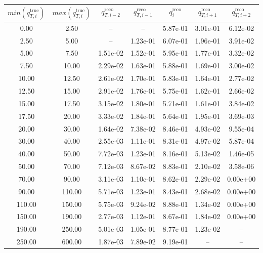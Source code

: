 \begin{tabular}{|cc||ccccc|} \hline 
$min(q^\mathrm{true}_{T,i})$ & $max(q^\mathrm{true}_{T,i})$ & $q^\mathrm{reco}_{T,i-2}$ & $q^\mathrm{reco}_{T,i-1}$ & $q^\mathrm{reco}_i$ & $q^\mathrm{reco}_{T,i+1}$ & $q^\mathrm{reco}_{T,i+2}$ \\ \hline 
 0.00 &  2.50 &  --  &  --  & 5.87e-01 & 3.01e-01 & 6.12e-02\\
 2.50 &  5.00 &  --  & 1.23e-01 & 6.07e-01 & 1.96e-01 & 3.91e-02\\
 5.00 &  7.50 & 1.51e-02 & 1.52e-01 & 5.95e-01 & 1.77e-01 & 3.32e-02\\
 7.50 & 10.00 & 2.29e-02 & 1.63e-01 & 5.88e-01 & 1.69e-01 & 3.00e-02\\
10.00 & 12.50 & 2.61e-02 & 1.70e-01 & 5.83e-01 & 1.64e-01 & 2.77e-02\\
12.50 & 15.00 & 2.91e-02 & 1.76e-01 & 5.75e-01 & 1.62e-01 & 2.66e-02\\
15.00 & 17.50 & 3.15e-02 & 1.80e-01 & 5.71e-01 & 1.61e-01 & 3.84e-02\\
17.50 & 20.00 & 3.33e-02 & 1.84e-01 & 5.64e-01 & 1.95e-01 & 3.69e-03\\
20.00 & 30.00 & 1.64e-02 & 7.38e-02 & 8.46e-01 & 4.93e-02 & 9.55e-04\\
30.00 & 40.00 & 2.55e-03 & 1.11e-01 & 8.31e-01 & 4.97e-02 & 5.87e-04\\
40.00 & 50.00 & 7.72e-03 & 1.23e-01 & 8.16e-01 & 5.13e-02 & 1.46e-05\\
50.00 & 70.00 & 7.12e-03 & 8.67e-02 & 8.83e-01 & 2.10e-02 & 3.58e-06\\
70.00 & 90.00 & 3.11e-03 & 1.10e-01 & 8.62e-01 & 2.29e-02 & 0.00e+00\\
90.00 & 110.00 & 5.71e-03 & 1.23e-01 & 8.43e-01 & 2.68e-02 & 0.00e+00\\
110.00 & 150.00 & 5.75e-03 & 9.24e-02 & 8.88e-01 & 1.34e-02 & 0.00e+00\\
150.00 & 190.00 & 2.77e-03 & 1.12e-01 & 8.67e-01 & 1.84e-02 & 0.00e+00\\
190.00 & 250.00 & 5.01e-03 & 1.05e-01 & 8.77e-01 & 1.23e-02 &  -- \\
250.00 & 600.00 & 1.87e-03 & 7.89e-02 & 9.19e-01 &  --  &  -- \\
\hline
\end{tabular}
